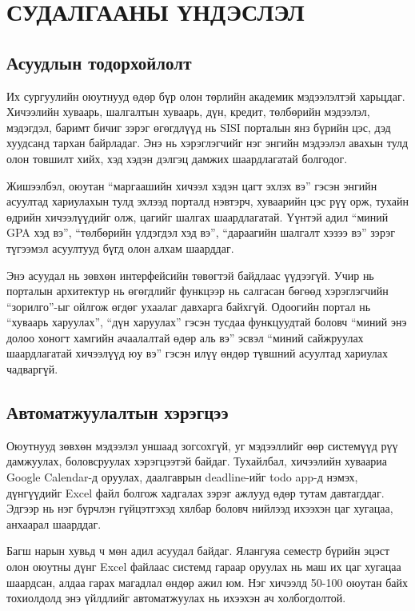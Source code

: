 \chapter{СУДАЛГААНЫ ҮНДЭСЛЭЛ}

\section{Асуудлын тодорхойлолт}

Их сургуулийн оюутнууд өдөр бүр олон төрлийн академик мэдээлэлтэй харьцдаг. Хичээлийн хуваарь, шалгалтын хуваарь, дүн, кредит, төлбөрийн мэдээлэл, мэдэгдэл, баримт бичиг зэрэг өгөгдлүүд нь SISI порталын янз бүрийн цэс, дэд хуудсанд тархан байрладаг. Энэ нь хэрэглэгчийг нэг энгийн мэдээлэл авахын тулд олон товшилт хийх, хэд хэдэн дэлгэц дамжих шаардлагатай болгодог.

Жишээлбэл, оюутан ``маргаашийн хичээл хэдэн цагт эхлэх вэ'' гэсэн энгийн асуултад хариулахын тулд эхлээд порталд нэвтэрч, хуваарийн цэс рүү орж, тухайн өдрийн хичээлүүдийг олж, цагийг шалгах шаардлагатай. Үүнтэй адил ``миний GPA хэд вэ'', ``төлбөрийн үлдэгдэл хэд вэ'', ``дараагийн шалгалт хэзээ вэ'' зэрэг түгээмэл асуултууд бүгд олон алхам шаарддаг.

Энэ асуудал нь зөвхөн интерфейсийн төвөгтэй байдлаас үүдээгүй. Учир нь порталын архитектур нь өгөгдлийг функцээр нь салгасан бөгөөд хэрэглэгчийн ``зорилго''-ыг ойлгож өгдөг ухаалаг давхарга байхгүй. Одоогийн портал нь ``хуваарь харуулах'', ``дүн харуулах'' гэсэн тусдаа функцуудтай боловч ``миний энэ долоо хоногт хамгийн ачаалалтай өдөр аль вэ'' эсвэл ``миний сайжруулах шаардлагатай хичээлүүд юу вэ'' гэсэн илүү өндөр түвшний асуултад хариулах чадваргүй.

\section{Автоматжуулалтын хэрэгцээ}

Оюутнууд зөвхөн мэдээлэл уншаад зогсохгүй, уг мэдээллийг өөр системүүд рүү дамжуулах, боловсруулах хэрэгцээтэй байдаг. Тухайлбал, хичээлийн хуваариа Google Calendar-д оруулах, даалгаврын deadline-ийг todo app-д нэмэх, дүнгүүдийг Excel файл болгож хадгалах зэрэг ажлууд өдөр тутам давтагддаг. Эдгээр нь нэг бүрчлэн гүйцэтгэхэд хялбар боловч нийлээд ихээхэн цаг хугацаа, анхаарал шаарддаг.

Багш нарын хувьд ч мөн адил асуудал байдаг. Ялангуяа семестр бүрийн эцэст олон оюутны дүнг Excel файлаас системд гараар оруулах нь маш их цаг хугацаа шаардсан, алдаа гарах магадлал өндөр ажил юм. Нэг хичээлд 50-100 оюутан байх тохиолдолд энэ үйлдлийг автоматжуулах нь ихээхэн ач холбогдолтой.

